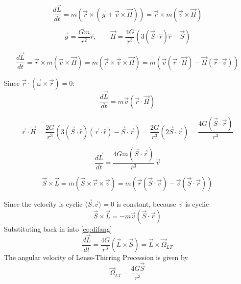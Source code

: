 \documentclass[12pt, a4paper]{article}
\theoremstyle{plain}
\theoremstyle{definition}
\theoremstyle{remark}
\begin{document}
\begin{equation}
    \frac{d\vec{L}}{dt} = m\left(\vec{r}\times(\vec{g}+\vec{v}\times\vec{H})\right) = \vec{r}\times m(\vec{v}\times\vec{H})
\end{equation}

\begin{equation}
    \vec{g} = \frac{Gm}{r^2}\hat{r}, \qquad \vec{H} = \frac{4G}{r^3}\left(3(\vec{S}\cdot\hat{r})\hat{r} - \vec{S}\right)
\end{equation}

\begin{equation}
    \frac{d\vec{L}}{dt} = \vec{r}\times m(\vec{v}\times\vec{H}) = m\left(\vec{r}\times\vec{v}\times\vec{H}\right)
    = m\left(\vec{v}(\vec{r}\cdot\vec{H}) - \vec{H}(\vec{r}\cdot\vec{v})\right)
\end{equation}

Since $\vec{r}\cdot(\vec{\omega}\times\vec{r}) = 0$:
\begin{equation}
    \frac{d\vec{L}}{dt} = m\vec{v}(\vec{r}\cdot\vec{H})
\end{equation}

\begin{equation}
    \vec{r}\cdot\vec{H} = \frac{2G}{r^3}\left(3(\vec{S}\cdot\hat{r})(\vec{r}\cdot\hat{r}) - \vec{S}\cdot\vec{r}\right)
    = \frac{2G}{r^3}(2\vec{S}\cdot\vec{r}) = \frac{4G(\vec{S}\cdot\vec{r})}{r^3}
\end{equation}

\begin{equation}
    \frac{d\vec{L}}{dt} = \frac{4Gm(\vec{S}\cdot\vec{r})}{r^3}\,\vec{v}
    \label{eq:difang}
\end{equation}

\begin{equation}
    \vec{S}\times\vec{L} = m(\vec{S}\times\vec{r}\times\vec{v})
    = m\left(\vec{r}(\vec{S}\cdot\vec{v}) - \vec{v}(\vec{S}\cdot\vec{r})\right)
\end{equation}

Since the velocity is cyclic $\langle \vec{S}.\vec{v} \rangle=0$ is constant, because $\vec{v}$ is cyclic
\begin{equation}
    \vec{S}\times\vec{L} = -m\vec{v}(\vec{S}\cdot\vec{r})
\end{equation}
Substituting back in into \eqref{eq:difang} 
\begin{equation}
    \frac{d\vec{L}}{dt} = \frac{4G}{r^3}(\vec{L}\times\vec{S}) = \vec{L}\times\vec{\Omega}_{LT}
\end{equation}
The angular velocity of Lense-Thirring Precession is given by
\begin{equation}
    {\vec{\Omega}_{LT} = \frac{4G\vec{S}}{r^3}}
\end{equation}
\end{document}
